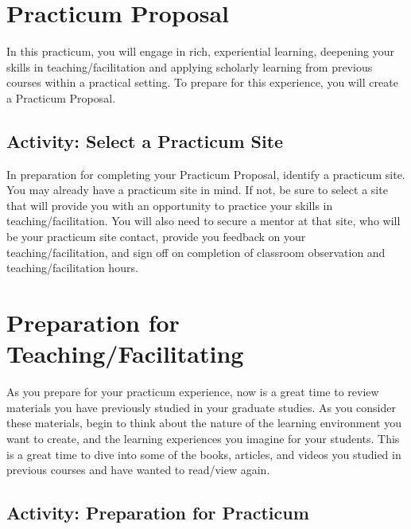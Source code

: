 \documentclass[
]{book}
\begin{document}
\hypertarget{practicum-proposal}{%
\section{Practicum Proposal}\label{practicum-proposal}}

In this practicum, you will engage in rich, experiential learning, deepening your skills in teaching/facilitation and applying scholarly learning from previous courses within a practical setting. To prepare for this experience, you will create a Practicum Proposal.

\hypertarget{activity-select-a-practicum-site}{%
\subsection*{Activity: Select a Practicum Site}\label{activity-select-a-practicum-site}}

\begin{reflect}
In preparation for completing your Practicum Proposal, identify a practicum site. You may already have a practicum site in mind. If not, be sure to select a site that will provide you with an opportunity to practice your skills in teaching/facilitation. You will also need to secure a mentor at that site, who will be your practicum site contact, provide you feedback on your teaching/facilitation, and sign off on completion of classroom observation and teaching/facilitation hours.
\end{reflect}

\hypertarget{preparation-for-teachingfacilitating}{%
\section{Preparation for Teaching/Facilitating}\label{preparation-for-teachingfacilitating}}

As you prepare for your practicum experience, now is a great time to review materials you have previously studied in your graduate studies. As you consider these materials, begin to think about the nature of the learning environment you want to create, and the learning experiences you imagine for your students. This is a great time to dive into some of the books, articles, and videos you studied in previous courses and have wanted to read/view again.

\hypertarget{activity-preparation-for-practicum}{%
\subsection*{Activity: Preparation for Practicum}\label{activity-preparation-for-practicum}}
\end{document}
